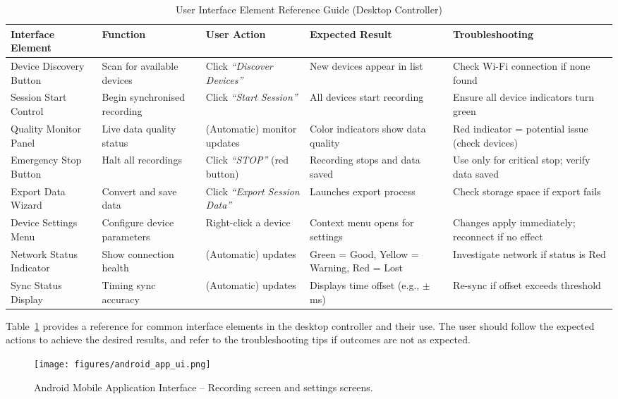 \documentclass[11pt,a4paper]{report}
\begin{document}
{\begin{table}[h!]\centering
\caption{User Interface Element Reference Guide (Desktop Controller)}
\label{tab:ui-elements}
\begin{tabular}{p{3cm} p{3cm} p{3cm} p{3cm} p{3cm}}
\toprule
\textbf{Interface Element} & \textbf{Function} & \textbf{User Action} & \textbf{Expected Result} & \textbf{Troubleshooting} \\
\midrule
Device Discovery Button & Scan for available devices & Click \textit{``Discover Devices''} & New devices appear in list & Check Wi-Fi connection if none found \\
Session Start Control & Begin synchronised recording & Click \textit{``Start Session''} & All devices start recording & Ensure all device indicators turn green \\
Quality Monitor Panel & Live data quality status & (Automatic) monitor updates & Color indicators show data quality & Red indicator = potential issue (check devices) \\
Emergency Stop Button & Halt all recordings & Click \textit{``STOP''} (red button) & Recording stops and data saved & Use only for critical stop; verify data saved \\
Export Data Wizard & Convert and save data & Click \textit{``Export Session Data''} & Launches export process & Check storage space if export fails \\
Device Settings Menu & Configure device parameters & Right-click a device & Context menu opens for settings & Changes apply immediately; reconnect if no effect \\
Network Status Indicator & Show connection health & (Automatic) updates & Green = Good, Yellow = Warning, Red = Lost & Investigate network if status is Red \\
Sync Status Display & Timing sync accuracy & (Automatic) updates & Displays time offset (e.g., $\pm$ms) & Re-sync if offset exceeds threshold \\
\bottomrule
\end{tabular}
\end{table}

Table~\ref{tab:ui-elements} provides a reference for common interface elements in the desktop controller and their use. The user should follow the expected actions to achieve the desired results, and refer to the troubleshooting tips if outcomes are not as expected.

\begin{figure}[h!]
\centering
\texttt{[image: figures/android\_app\_ui.png]}
\caption{Android Mobile Application Interface – Recording screen and settings screens.}
\label{fig:android-ui}
\end{figure}

}
\end{document}

